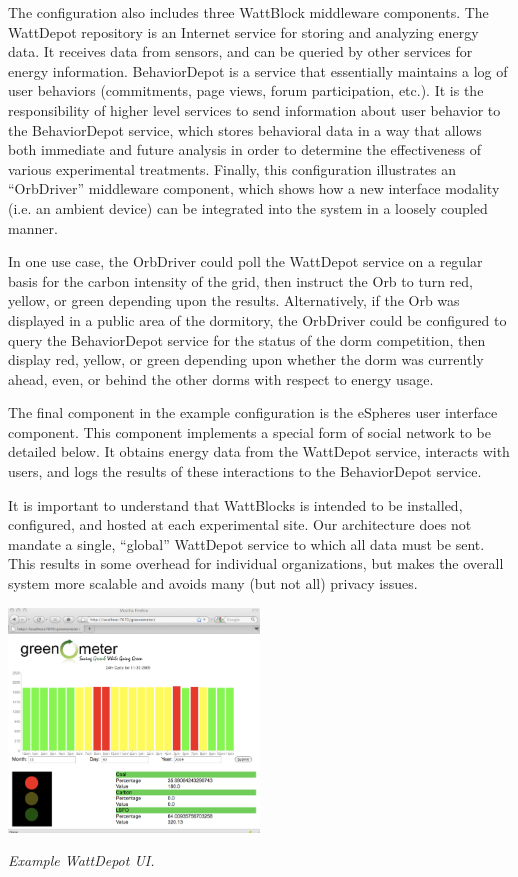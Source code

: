 The configuration also includes three WattBlock middleware components.  The
WattDepot repository is an Internet service for storing and analyzing
energy data.  It receives data from sensors, and can be queried by other
services for energy information.  BehaviorDepot is a service that
essentially maintains a log of user behaviors (commitments, page views,
forum participation, etc.).  It is the responsibility of higher level
services to send information about user behavior to the BehaviorDepot
service, which stores behavioral data in a way that allows both immediate
and future analysis in order to determine the effectiveness of various
experimental treatments.  Finally, this configuration illustrates an
``OrbDriver'' middleware component, which shows how a new interface
modality (i.e. an ambient device) can be integrated into the system in a
loosely coupled manner.

In one use case,  the OrbDriver could poll the WattDepot service on a regular
basis for the carbon intensity of the grid, then instruct the Orb to turn
red, yellow, or green depending upon the results. Alternatively, if the Orb
was displayed in a public area of the dormitory, the OrbDriver could be
configured to query the BehaviorDepot service for the status of the dorm
competition, then display red, yellow, or green depending upon whether the
dorm was currently ahead, even, or behind the other dorms with respect to
energy usage.

The final component in the example configuration is the eSpheres user
interface component.  This component implements a special form of social
network to be detailed below. It obtains energy data from the WattDepot service,
interacts with users, and logs the results of these interactions to the
BehaviorDepot service.

It is important to understand that WattBlocks is intended to be installed,
configured, and hosted at each experimental site.  Our architecture does
not mandate a single, ``global'' WattDepot service to which all data
must be sent.  This results in some overhead for
individual organizations, but makes the overall system more scalable and
avoids many (but not all) privacy issues.


\begin{floatingfigure}[l]{3.75in}
 \includegraphics[width=0.5\textwidth]{greenometer.2.eps}
  \caption{\em \small Example WattDepot UI.}
 \label{fig:WattDepotUI}
\end{floatingfigure} 


